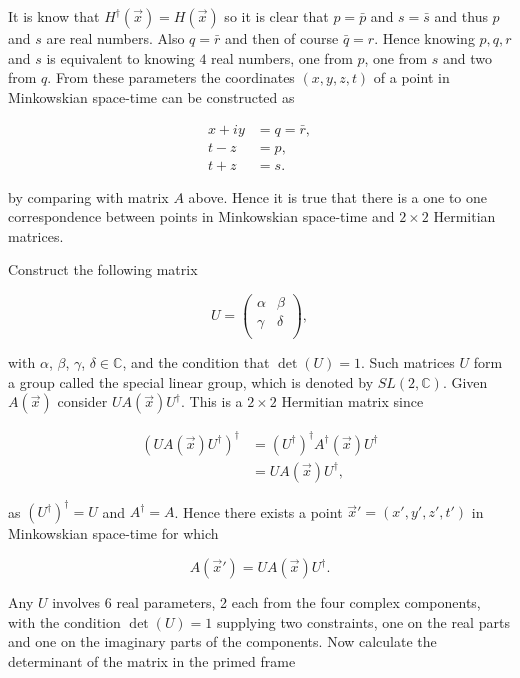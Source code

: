 \noindent It is know that $H^{\dagger}(\vec{x}) = H(\vec{x})$ so it is clear that $p = \bar{p}$ and $s = \bar{s}$ and thus $p$ and $s$ are real numbers. Also $q = \bar{r}$ and then of course $\bar{q} = r$. Hence knowing $p,q,r$ and $s$ is equivalent to knowing $4$ real numbers, one from $p$, one from $s$ and two from $q$. From these parameters the coordinates $(x,y,z,t)$ of a point in Minkowskian space-time can be constructed as

\begin{align*}
x + iy & = q = \bar{r}, \\
t - z & = p, \\
t+z  & = s.
\end{align*}

\noindent by comparing with matrix $A$ above. Hence it is true that there is a one to one correspondence between points in Minkowskian space-time and $2 \times 2$ Hermitian matrices.

Construct the following matrix

\begin{equation*} 
U = \left( 
\begin{array}{cc}
\alpha & \beta \\
\gamma & \delta \\
\end{array}
\right),
\end{equation*}

\noindent with $\alpha$, $\beta$, $\gamma$, $\delta \in \mathbb{C}$, and the condition that $\det(U) = 1$. Such matrices $U$ form a group called the special linear group, which is denoted by $SL(2, \mathbb{C})$. Given $A(\vec{x})$ consider $U A(\vec{x}) U^{\dagger}$. This is a $2 \times 2$ Hermitian matrix since

\begin{align*}
(U A(\vec{x}) U^{\dagger})^{\dagger} & =  (U^{\dagger})^{\dagger} A^{\dagger}(\vec{x}) U^{\dagger} \\
                                     & = U A(\vec{x}) U^{\dagger},
\end{align*} 

\noindent as $(U^{\dagger})^{\dagger} = U$ and $A^{\dagger} = A$. Hence there exists a point $\vec{x}' = (x', y', z', t')$ in Minkowskian space-time for which

\begin{equation}\label{SL_trans}
A(\vec{x}') = U A(\vec{x}) U^{\dagger}.
\end{equation}

Any $U$ involves 6 real parameters, 2 each from the four complex components, with the condition $\det(U) = 1$ supplying two constraints, one on the real parts and one on the imaginary parts of the components. Now calculate the determinant of the matrix in the primed frame


